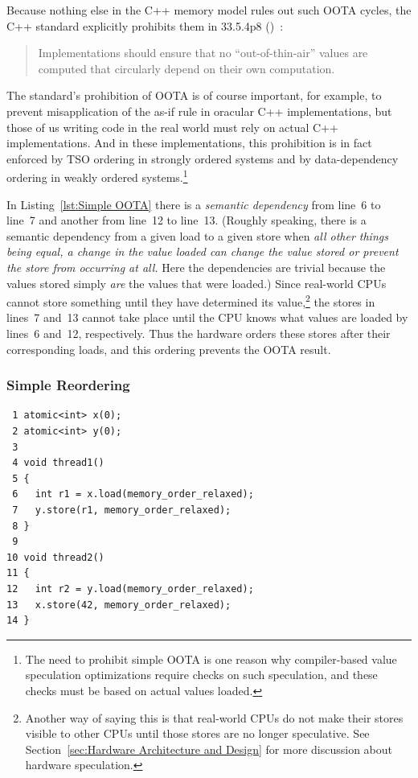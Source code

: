 \documentclass[10]{article}
\begin{document}
Because nothing else in the C++ memory model rules out such OOTA cycles,
the C++ standard explicitly prohibits them in 33.5.4p8
()~\cite{ThomasKoeppe2023N4950}:
\begin{quote}
	Implementations should ensure that no “out-of-thin-air” values
	are computed that circularly depend on their own computation.
\end{quote}
The standard's prohibition of OOTA is of course important, for example, to
prevent misapplication of the as-if rule in oracular C++ implementations,
but those of us writing code in the real world must rely on actual C++
implementations.
And in these implementations, this prohibition is in fact enforced by TSO
ordering in strongly ordered systems and by data-dependency ordering in
weakly ordered systems.\footnote{
	The need to prohibit simple OOTA is one reason why compiler-based
	value speculation optimizations require checks on such
	speculation, and these checks must be based on actual values
	loaded.}

In Listing~\ref{lst:Simple OOTA}
there is a \emph{semantic dependency} from line~6 to line~7 and
another from line~12 to line~13.
(Roughly speaking, there is a semantic dependency from a given load
to a given store when \emph{all other things being equal, a change in the
value loaded can change the value stored or prevent the store from
occurring at all.}
Here the dependencies are trivial because the values stored simply
\emph{are} the values that were loaded.)
Since real-world CPUs cannot store something
until they have determined its value,\footnote{
	Another way of saying this is that real-world CPUs do not
	make their stores visible to other CPUs until those stores
	are no longer speculative.
	See Section~\ref{sec:Hardware Architecture and Design}
	for more discussion about hardware speculation.}
the stores in lines~7 and~13 cannot take place until the CPU
knows what values are loaded by lines~6 and~12, respectively.
Thus the hardware orders these stores after their corresponding loads,
and this ordering prevents the OOTA result.

\subsubsection{Simple Reordering}
\label{sec:Simple Reordering}

\begin{listing}[tbp]
\begin{verbatim}
 1 atomic<int> x(0);
 2 atomic<int> y(0);
 3
 4 void thread1()
 5 {
 6   int r1 = x.load(memory_order_relaxed);
 7   y.store(r1, memory_order_relaxed);
 8 }
 9
10 void thread2()
11 {
12   int r2 = y.load(memory_order_relaxed);
13   x.store(42, memory_order_relaxed);
14 }
\end{verbatim}
\caption{Simple Reordering}
\label{lst:Simple Reordering}
\end{listing}
\end{document}
